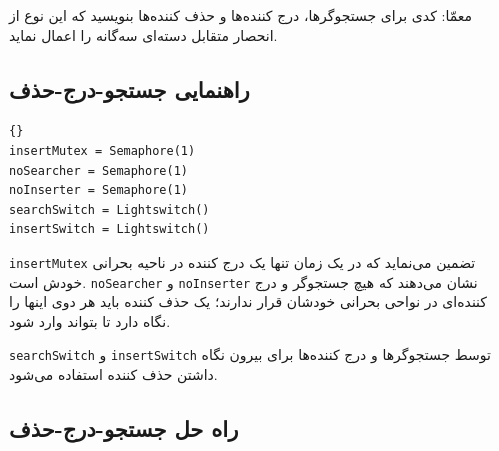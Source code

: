 \documentclass{book}
\newcommand{\clearemptydoublepage}{\newpage\cleardoublepage}
\begin{document}
    معمّا: کدی برای جستجوگرها، درج کننده‌ها و حذف کننده‌ها بنویسید که این نوع از انحصار متقابل دسته‌ای سه‌گانه را اعمال نماید. 


\clearemptydoublepage
\subsection{راهنمایی جستجو-درج-حذف}

\begin{latin}
\begin{latin}
\begin{lstlisting}[title=\rl{راهنمایی جستجو-درج-حذف}]{}
insertMutex = Semaphore(1)
noSearcher = Semaphore(1)
noInserter = Semaphore(1)
searchSwitch = Lightswitch()    
insertSwitch = Lightswitch()
\end{lstlisting}
\end{latin}
\end{latin}

    {\tt insertMutex}
     تضمین می‌نماید که در یک زمان تنها یک درج کننده در ناحیه بحرانی خودش است. 
      {\tt noSearcher} و {\tt noInserter} 
    نشان می‌دهند که هیچ جستجوگر و درج کننده‌ای در نواحی بحرانی خودشان قرار ندارند؛ یک حذف کننده باید هر دوی 
    اینها را نگاه دارد تا بتواند وارد شود. 

{\tt searchSwitch} و {\tt insertSwitch} 
 توسط جستجوگرها و درج‌ کننده‌ها برای بیرون نگاه داشتن حذف کننده استفاده می‌شود. 


\clearemptydoublepage
\subsection{راه حل جستجو-درج-حذف}
\end{document}
